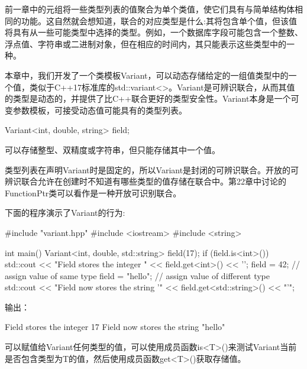 前一章中的元组将一些类型列表的值聚合为单个类值，使它们具有与简单结构体相同的功能。这自然就会想知道，联合的对应类型是什么:其将包含单个值，但该值将具有从一些可能类型中选择的类型。例如，一个数据库字段可能包含一个整数、浮点值、字符串或二进制对象，但在相应的时间内，其只能表示这些类型中的一种。

本章中，我们开发了一个类模板Variant，可以动态存储给定的一组值类型中的一个值，类似于C++17标准库的std::variant<>。Variant是可辨识联合，从而其值的类型是动态的，并提供了比C++联合更好的类型安全性。Variant本身是一个可变参数模板，可接受动态值可能具有的类型列表。

\begin{cpp}
Variant<int, double, string> field;
\end{cpp}

可以存储整型、双精度或字符串，但只能存储其中一个值。

\begin{notice}类型列表在声明Variant时是固定的，所以Variant是封闭的可辨识联合。开放的可辨识联合允许在创建时不知道有哪些类型的值存储在联合中。第22章中讨论的FunctionPtr类可以看作是一种开放可识别联合。
\end{notice}

下面的程序演示了Variant的行为:

\begin{cpp}
#include "variant.hpp"
#include <iostream>
#include <string>
 
int main()
{
	Variant<int, double, std::string> field(17);
	if (field.is<int>()) {
		std::cout << "Field stores the integer "
				<< field.get<int>() << ’\n’;
	}
	field = 42; // assign value of same type
	field = "hello"; // assign value of different type
	std::cout << "Field now stores the string ’"
			<< field.get<std::string>() << "’\n";
}
\end{cpp}

输出：

\begin{shell}
Field stores the integer 17
Field now stores the string "hello"
\end{shell}

可以赋值给Variant任何类型的值，可以使用成员函数is<T>()来测试Variant当前是否包含类型为T的值，然后使用成员函数get<T>()获取存储值。































